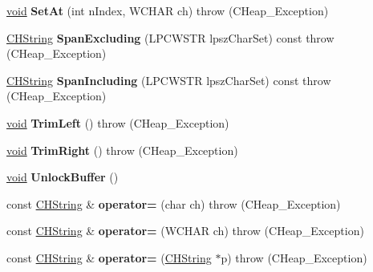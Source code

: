 \begin{DoxyCompactItemize}
\hyperlink{interfacevoid}{void} {\bfseries Set\+At} (int n\+Index, W\+C\+H\+AR ch)  throw (\+C\+Heap\+\_\+\+Exception)
\item 
\mbox{\label{class_c_h_string_a52a39a77b142c1e15fcf172e064aa86e}} 
\hyperlink{class_c_h_string}{C\+H\+String} {\bfseries Span\+Excluding} (L\+P\+C\+W\+S\+TR lpsz\+Char\+Set) const  throw (\+C\+Heap\+\_\+\+Exception)
\item 
\mbox{\label{class_c_h_string_a58ccfddac764a77e1f36fddc86086d62}} 
\hyperlink{class_c_h_string}{C\+H\+String} {\bfseries Span\+Including} (L\+P\+C\+W\+S\+TR lpsz\+Char\+Set) const  throw (\+C\+Heap\+\_\+\+Exception)
\item 
\mbox{\label{class_c_h_string_a1c63c45c325188d5ca8f5b01dcda2fde}} 
\hyperlink{interfacevoid}{void} {\bfseries Trim\+Left} ()  throw (\+C\+Heap\+\_\+\+Exception)
\item 
\mbox{\label{class_c_h_string_a942c445c05a2f9877cd95d21498b3d16}} 
\hyperlink{interfacevoid}{void} {\bfseries Trim\+Right} ()  throw (\+C\+Heap\+\_\+\+Exception)
\item 
\mbox{\label{class_c_h_string_a3cc0162b4b9939156acac535d941d827}} 
\hyperlink{interfacevoid}{void} {\bfseries Unlock\+Buffer} ()
\item 
\mbox{\label{class_c_h_string_a4e0bda4d262c308cf9fdeb8df0148ebe}} 
const \hyperlink{class_c_h_string}{C\+H\+String} \& {\bfseries operator=} (char ch)  throw (\+C\+Heap\+\_\+\+Exception)
\item 
\mbox{\label{class_c_h_string_a6bbbce398b84b5f6827e98a98e5dd91a}} 
const \hyperlink{class_c_h_string}{C\+H\+String} \& {\bfseries operator=} (W\+C\+H\+AR ch)  throw (\+C\+Heap\+\_\+\+Exception)
\item 
\mbox{\label{class_c_h_string_acff3cbe8ca2e85cde3f781a53c5f1114}} 
const \hyperlink{class_c_h_string}{C\+H\+String} \& {\bfseries operator=} (\hyperlink{class_c_h_string}{C\+H\+String} $\ast$p)  throw (\+C\+Heap\+\_\+\+Exception)
\item 
\mbox{\label{class_c_h_string_a4ca0719c581994b01aacdc465862a7ce}} 

\end{DoxyCompactItemize}
